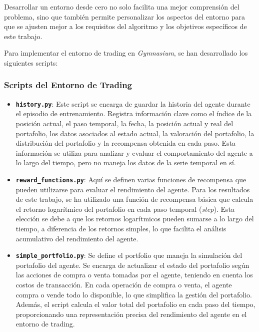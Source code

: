\documentclass[a4paper,12pt, twoside]{report}
\begin{document}
Desarrollar un entorno desde cero no solo facilita una mejor comprensión del problema, 
sino que también permite personalizar los aspectos del entorno para que se ajusten mejor 
a los requisitos del algoritmo y los objetivos específicos de este trabajo.

Para implementar el entorno de trading en \textit{Gymnasium}, se han desarrollado 
los siguientes scripts:

\subsubsection{Scripts del Entorno de Trading}

\begin{itemize}
    \item \textbf{\texttt{history.py}}: Este script se encarga de guardar la historia del agente durante el episodio de entrenamiento. Registra información clave como el índice de la posición actual, el paso temporal, la fecha, la posición actual y real del portafolio, los datos asociados al estado actual, la valoración del portafolio, la distribución del portafolio y la recompensa obtenida en cada paso. Esta información se utiliza para analizar y evaluar el comportamiento del agente a lo largo del tiempo, pero no maneja los datos de la serie temporal en sí.

    \item \textbf{\texttt{reward\_functions.py}}: Aquí se definen varias funciones de recompensa que pueden utilizarse para evaluar el rendimiento del agente. Para los resultados de este trabajo, se ha utilizado una función de recompensa básica que calcula el retorno logarítmico del portafolio en cada paso temporal (\textit{step}). Esta elección se debe a que los retornos logarítmicos pueden sumarse a lo largo del tiempo, a diferencia de los retornos simples, lo que facilita el análisis acumulativo del rendimiento del agente.

    \item \textbf{\texttt{simple\_portfolio.py}}: Se define el portfolio que maneja la simulación del portafolio del agente. Se encarga de actualizar el estado del portafolio según las acciones de compra o venta tomadas por el agente, teniendo en cuenta los costos de transacción. En cada operación de compra o venta, el agente compra o vende todo lo disponible, lo que simplifica la gestión del portafolio. Además, el script calcula el valor total del portafolio en cada paso del tiempo, proporcionando una representación precisa del rendimiento del agente en el entorno de trading.


\end{itemize}
\end{document}
